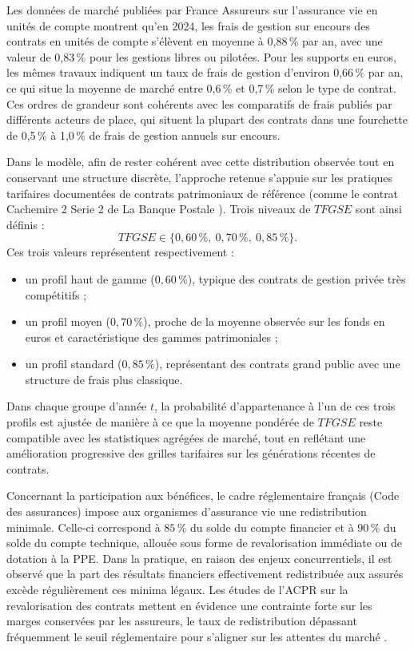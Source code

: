 Les données de marché publiées par France Assureurs \cite{faUC2024} sur l'assurance vie en unités de compte montrent qu'en 2024, les frais de gestion sur encours des contrats en unités de compte s'élèvent en moyenne à 0{,}88\,\% par an, avec une valeur de 0{,}83\,\% pour les gestions libres ou pilotées. Pour les supports en euros, les mêmes travaux indiquent un taux de frais de gestion d'environ 0{,}66\,\% par an, ce qui situe la moyenne de marché entre 0{,}6\,\% et 0{,}7\,\% selon le type de contrat. Ces ordres de grandeur sont cohérents avec les comparatifs de frais publiés par différents acteurs de place, qui situent la plupart des contrats dans une fourchette de 0{,}5\,\% à 1{,}0\,\% de frais de gestion annuels sur encours.

Dans le modèle, afin de rester cohérent avec cette distribution observée tout en conservant une structure discrète, l'approche retenue s'appuie sur les pratiques tarifaires documentées de contrats patrimoniaux de référence (comme le contrat Cachemire 2 Serie 2 de La Banque Postale \cite{cgs_cachemire}). Trois niveaux de $TFGSE$ sont ainsi définis :
\[
  TFGSE \in \{0{,}60\,\%,\ 0{,}70\,\%,\ 0{,}85\,\%\}.
\]
Ces trois valeurs représentent respectivement :
\begin{itemize}
  \item un profil haut de gamme ($0{,}60\,\%$), typique des contrats de gestion privée très compétitifs ;
  \item un profil moyen ($0{,}70\,\%$), proche de la moyenne observée sur les fonds en euros et caractéristique des gammes patrimoniales ;
  \item un profil standard ($0{,}85\,\%$), représentant des contrats grand public avec une structure de frais plus classique.
\end{itemize}
Dans chaque groupe d'année $t$, la probabilité d'appartenance à l'un de ces trois profils est ajustée de manière à ce que la moyenne pondérée de $TFGSE$ reste compatible avec les statistiques agrégées de marché, tout en reflétant une amélioration progressive des grilles tarifaires sur les générations récentes de contrats.

Concernant la participation aux bénéfices, le cadre réglementaire français (Code des assurances) impose aux organismes d'assurance vie une redistribution minimale. Celle-ci correspond à $85\,\%$ du solde du compte financier et à $90\,\%$ du solde du compte technique, allouée sous forme de revalorisation immédiate ou de dotation à la PPE. Dans la pratique, en raison des enjeux concurrentiels, il est observé que la part des résultats financiers effectivement redistribuée aux assurés excède régulièrement ces minima légaux. Les études de l'ACPR sur la revalorisation des contrats mettent en évidence une contrainte forte sur les marges conservées par les assureurs, le taux de redistribution dépassant fréquemment le seuil réglementaire pour s'aligner sur les attentes du marché \cite{acprTauxBas,acprRevalo2024}.

